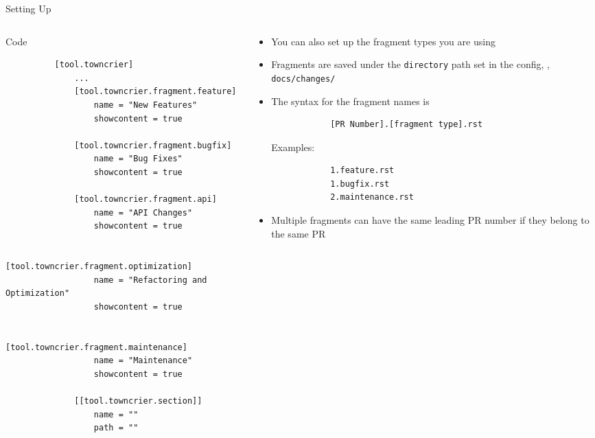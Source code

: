 \begin{frame}[fragile]{Setting Up \tc}
  \begin{columns}[t, onlytextwidth]
    \begin{column}{0.48\textwidth}
      \begin{block}{Code}
        \footnotesize
        \begin{verbatim}
          [tool.towncrier]
              ...
              [tool.towncrier.fragment.feature]
                  name = "New Features"
                  showcontent = true

              [tool.towncrier.fragment.bugfix]
                  name = "Bug Fixes"
                  showcontent = true

              [tool.towncrier.fragment.api]
                  name = "API Changes"
                  showcontent = true

              [tool.towncrier.fragment.optimization]
                  name = "Refactoring and Optimization"
                  showcontent = true

              [tool.towncrier.fragment.maintenance]
                  name = "Maintenance"
                  showcontent = true

              [[tool.towncrier.section]]
                  name = ""
                  path = ""
        \end{verbatim}
      \end{block}
    \end{column}
    \hfill
    \begin{column}{0.48\textwidth}
      \begin{itemize}
        \setlength{\itemsep}{1.5em}
        \item You can also set up the fragment types you are using
        \item Fragments are saved under the \texttt{directory} path set in the config, \eg,
          \texttt{docs/changes/}
        \item The syntax for the fragment names is
          \begin{verbatim}
            [PR Number].[fragment type].rst
          \end{verbatim}
          \vspace{0.5em}
          Examples:
          \begin{verbatim}
            1.feature.rst
            1.bugfix.rst
            2.maintenance.rst
          \end{verbatim}
        \item Multiple fragments can have the same leading PR number if they belong
          to the same PR
      \end{itemize}
      \end{column}
  \end{columns}
\end{frame}

